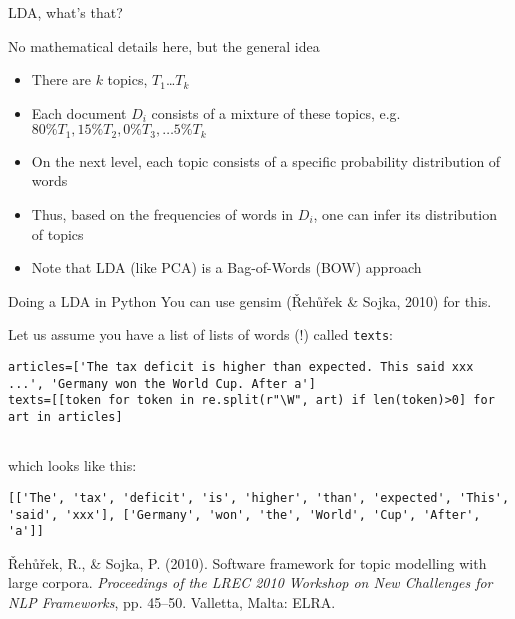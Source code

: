 \documentclass[compress]{beamer}
\begin{document}
\begin{frame}{LDA, what's that?}
	\begin{block}{No mathematical details here, but the general idea}
		\begin{itemize}
			\item There are $k$ topics, $T_1$\ldots$T_k$
			\item Each document $D_i$ consists of a mixture of these topics, e.g.$80\% T_1, 15\% T_2, 0\% T_3, \ldots 5\% T_k $
			\item On the next level, each topic consists of a specific probability distribution of words
			\item Thus, based on the frequencies of words in $D_i$, one can infer its distribution of topics
			\item Note that LDA (like PCA) is a Bag-of-Words (BOW) approach
		\end{itemize}
	\end{block}
	
\end{frame}




\begin{frame}[fragile]{Doing a LDA in Python}
You can use gensim ({\v R}eh{\r u}{\v r}ek \& Sojka, 2010) for this.

Let us assume you have a list of lists of words (!) called \texttt{texts}:

\begin{lstlisting}
articles=['The tax deficit is higher than expected. This said xxx ...', 'Germany won the World Cup. After a']
texts=[[token for token in re.split(r"\W", art) if len(token)>0] for art in articles]


\end{lstlisting}
which looks like this:
\begin{lstlisting}
[['The', 'tax', 'deficit', 'is', 'higher', 'than', 'expected', 'This', 'said', 'xxx'], ['Germany', 'won', 'the', 'World', 'Cup', 'After', 'a']]
\end{lstlisting}

\tiny{{\v R}eh{\r u}{\v r}ek, R., \& Sojka, P. (2010). Software framework for topic modelling with large corpora. \emph{Proceedings of the LREC 2010 Workshop on New Challenges for NLP Frameworks}, pp. 45–50. Valletta, Malta: ELRA. }

\end{frame}
\end{document}
